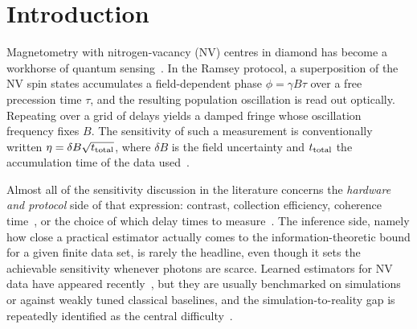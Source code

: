 \documentclass[aps,pra,twocolumn,superscriptaddress,nofootinbib]{revtex4-2}
\newcommand{\dB}{\delta B}
\newcommand{\etaS}{\eta}
\begin{document}
\begin{abstract}
consistency that no single classical estimator achieves --- although it is never itself the
best. The practical rule that follows is not
"pool then stop sharing" but "pool over settings you can also constrain
individually": an instrument's sweep often contains records that a single trace cannot
identify, and those records corrupt the very shared nuisance that pooling is meant to
estimate. Both the law and the crossover are conditional: they hold for an
identifiability-filtered session, and for data whose blind FFT$+$Rife initialisation lands
inside the refinement window --- a condition we verify on these traces (median
initialisation error $1.1\times10^{3}$~nT against a $\pm3.2\times10^{3}$~nT window) but
which an analysis of other data must re-check.
\end{abstract}

\maketitle

\section{Introduction}

Magnetometry with nitrogen-vacancy (NV) centres in diamond has become a workhorse of
quantum sensing~\cite{Taylor2008,Maze2008,Balasubramanian2008,Degen2017,Barry2020}. In the
Ramsey protocol, a superposition of the NV spin states accumulates a field-dependent phase
$\phi=\gamma B\tau$ over a free precession time $\tau$, and the resulting population
oscillation is read out optically. Repeating over a grid of delays yields a damped fringe
whose oscillation frequency fixes $B$. The sensitivity of such a measurement is
conventionally written $\etaS=\dB\sqrt{t_{\rm total}}$, where $\dB$ is the field
uncertainty and $t_{\rm total}$ the accumulation time of the data used~\cite{Barry2020}.

Almost all of the sensitivity discussion in the literature concerns the \emph{hardware and
protocol} side of that expression: contrast, collection efficiency, coherence
time~\cite{Barry2020,Rondin2014}, or the choice of which delay times to
measure~\cite{Santagati2019}. The inference side, namely how close a practical estimator
actually comes to the information-theoretic bound for a given finite data set, is rarely
the headline, even though it sets the achievable sensitivity whenever photons are scarce.
Learned estimators for NV data have appeared
recently~\cite{Guo2025,NVRNet2026,Haim2025,Daniel2026,Youssry2026}, but they are usually
benchmarked on simulations or against weakly tuned classical baselines, and the
simulation-to-reality gap is repeatedly identified as the central
difficulty~\cite{NVRNet2026,Daniel2026}.
\end{document}
